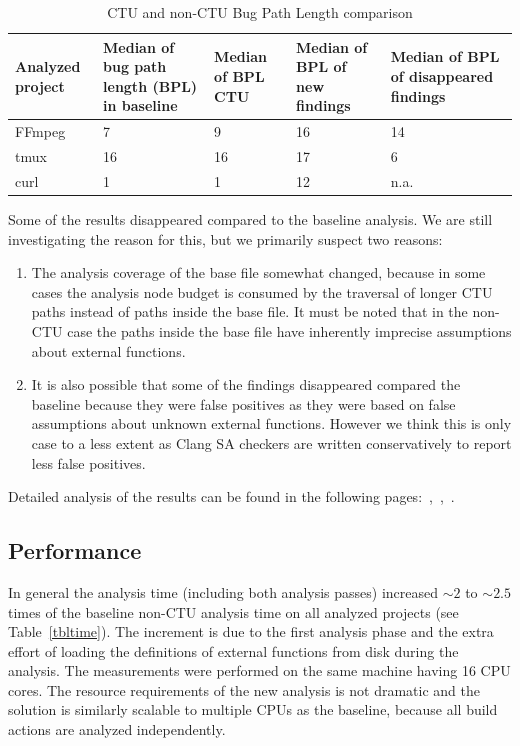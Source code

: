 \documentclass{article}
\begin{document}
\begin {table}[h!]
\centering
\begin{tabular}{| C{2cm}|| C{2cm} | C{2cm} |C{2cm} |C{2cm} |}
  \hline
  Analyzed project & Median of bug path length (BPL) in baseline&Median of BPL CTU&Median of BPL of new findings&Median of BPL of disappeared findings\\
  \hline
  \hline
  FFmpeg&7&9&16&14\\
  \hline
  tmux&16&16&17&6\\
  \hline
  curl& 1&1&12&n.a.\\
  \hline  
\end{tabular}
\caption{CTU and non-CTU Bug Path Length comparison}
\label{tblbpl}
\end{table}

Some of the results disappeared compared to the baseline analysis. 
We are still investigating the reason for this, but we primarily 
suspect two reasons:

\begin{enumerate}
  \item The analysis coverage of the base file somewhat changed,
        because in some cases the analysis node budget is consumed
        by the traversal of longer CTU paths instead of paths inside the base
        file. It must be noted that in the non-CTU case the paths inside the
        base file have inherently imprecise assumptions about external
        functions.

  \item It is also possible that some of the findings disappeared
        compared the baseline because they were false positives as they were
        based on false assumptions about unknown external functions. However
        we think this is only case to a less extent as Clang SA checkers are written
        conservatively to report less false positives.
\end{enumerate}

Detailed analysis of the results can be found in the following
pages:~\cite{ffmpegres},~\cite{tmuxres},~\cite{curlres}.

\subsection{Performance}
In general the analysis time (including both analysis passes) 
increased $\sim 2$ to $\sim 2.5$ times of the baseline non-CTU analysis time on all analyzed
projects (see Table~\ref{tbltime}). The increment is due to the first analysis phase and the extra effort
of loading the definitions of external functions from disk during the
analysis. The measurements were performed on the same machine having 16 CPU cores.
The resource requirements of the new analysis is not dramatic and the solution is
similarly scalable to multiple CPUs as the baseline, because all build actions
are analyzed independently.
\end{document}
